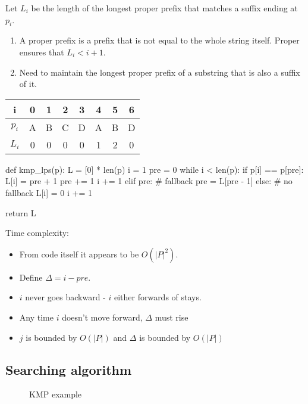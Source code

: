 Let $L_i$ be the length of the longest proper prefix that matches a suffix ending at $p_i$. 
\begin{enumerate}
\item A proper prefix is a prefix that is not equal to the whole string itself. Proper ensures that $L_i < i+1$.
\item Need to maintain the longest proper prefix of a substring that is also a suffix of it.
\end{enumerate}

\begin{table}[h!]
\centering
\begin{tabular}{c|ccccccc}
  \toprule
  \textbf{i}   & 0 & 1 & 2 & 3 & 4 & 5 & 6 \\
  \midrule
  \textbf{$p_i$} & A & B & C & D & A & B & D \\
  \textbf{$L_i$} & 0 & 0 & 0 & 0 & 1 & 2 & 0 \\
  \bottomrule
\end{tabular}
\end{table}
\begin{python}
def kmp_lps(p):
    L = [0] * len(p)
    i = 1
    pre = 0
    while i < len(p):
        if p[i] == p[pre]:
            L[i] = pre + 1
            pre += 1
            i += 1
        elif pre:  # fallback
            pre = L[pre - 1]
        else:  # no fallback
            L[i] = 0
            i += 1

    return L
\end{python}
Time complexity:
\begin{itemize}
\item From code itself it appears to be $O(|P|^2)$.
\item Define $\Delta = i - pre$.
\item $i$ never goes backward - $i$ either forwards of stays.
\item Any time $i$ doesn’t move forward, $\Delta$ must rise
\item $j$ is bounded by $O(|P|)$ and $\Delta$ is bounded by $O(|P|)$
\end{itemize}
\subsection{Searching algorithm}
\begin{figure}[]
\centering
{}
\caption{KMP example}
\label{fig:kmp_presuffix}
\end{figure}


